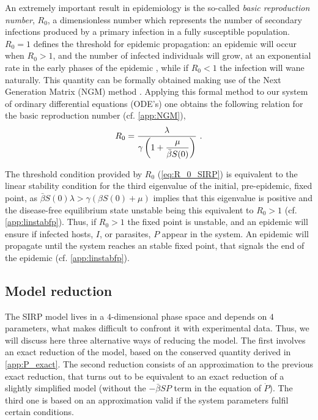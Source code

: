 An extremely important result in epidemiology is the so-called
\textit{basic reproduction number}, $R_0$, a dimensionless number which
represents the number of secondary infections produced by a primary infection
in a fully susceptible population. $R_0=1$ defines the threshold for epidemic
propagation: an epidemic will occur when $R_0>1$, and the number of infected
individuals will grow, at an exponential rate in the early phases of the
epidemic \cite{Castro2020}, while if $R_0<1$ the infection will wane
naturally.
This quantity can be formally obtained making use of the Next Generation
Matrix (NGM) method \cite{Theory_next_gen_matrix, Diekmann2010}. Applying this
formal method to our system of ordinary differential equations (ODE's) one
obtains the following relation for the basic reproduction number (cf.
\ref{app:NGM}),
\begin{equation}\label{eq:R_0_SIRP}
    R_0=\frac{\lambda}{\gamma\left(1+\displaystyle\frac{\mu}{\bar{\beta}
                S(0)}\right)} \ .
\end{equation}

The threshold condition provided by $R_0$ (\cref{eq:R_0_SIRP}) is
equivalent
to the linear stability condition for the third eigenvalue of the initial,
pre-epidemic, fixed point, as $\bar{\beta} S(0) \lambda>\gamma(\beta S(0)+\mu)$
implies that this eigenvalue is positive and the disease-free equilibrium
state unstable being this
equivalent to $R_0>1$ (cf. \ref{app:linstabfp}).
Thus, if $R_0>1$ the fixed point is unstable, and an epidemic will ensure
if infected hosts, $I$, or parasites, $P$ appear in the system. An epidemic
will propagate until the system reaches an stable fixed point, that signals the
end of the epidemic (cf. \ref{app:linstabfp}).

\subsection{Model reduction} \label{sec:reduction}

The SIRP model lives in a $4$-dimensional phase space and depends on $4$
parameters, what makes difficult to confront it with experimental data. Thus,
we will discuss here
three alternative ways of reducing the model. The first involves an exact
reduction of the model, based on the conserved quantity derived in
\ref{app:P_exact}. The second reduction consists of an approximation to the
previous exact reduction, that turns out to be equivalent to an exact reduction
of a slightly simplified model (without the $-\bar{\beta}SP$ term in the
equation of $\dot{P}$). The third one is based on an approximation valid if the
system parameters fulfil certain conditions.

